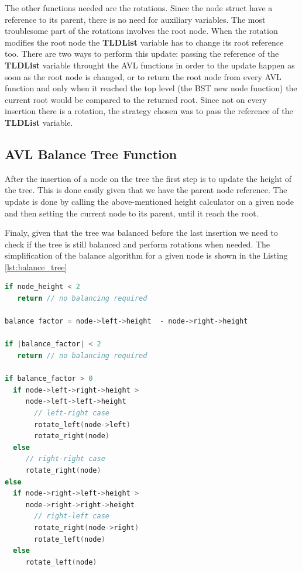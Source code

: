 \documentclass[twocolumn,10pt]{article}
\begin{document}
The other functions needed are the rotations. Since the node struct have a reference to its parent, there is no need for auxiliary variables. The most troublesome part of the rotations involves the root node. When the rotation modifies the root node the \textbf{TLDList} variable has to change its root reference too. There are two ways to perform this update: passing the reference of the \textbf{TLDList} variable throught the AVL functions in order to the update happen as soon as the root node is changed, or to return the root node from every AVL function and only when it reached the top level (the BST new node function) the current root would be compared to the returned root. Since not on every insertion there is a rotation, the strategy chosen was to pass the reference of the \textbf{TLDList} variable.

\subsection{AVL Balance Tree Function}

After the insertion of a node on the tree the first step is to update the height of the tree. This is done easily given that we have the parent node reference. The update is done by calling the above-mentioned height calculator on a given node and then setting the current node to its parent, until it reach the root.

Finaly, given that the tree was balanced before the last insertion we need to check if the tree is still balanced and perform rotations when needed. The simplification of the balance algorithm for a given node is shown in the Listing \ref{lst:balance_tree}

\begin{lstlisting}[language=C, caption={Balance Algorithm}, label=lst:balance_tree]
if node_height < 2
   return // no balancing required

balance factor = node->left->height  - node->right->height

if |balance_factor| < 2
   return // no balancing required

if balance_factor > 0
  if node->left->right->height > 
     node->left->left->height
       // left-right case
       rotate_left(node->left)
       rotate_right(node)
  else
     // right-right case
     rotate_right(node)
else
  if node->right->left->height >
     node->right->right->height
       // right-left case
       rotate_right(node->right)
       rotate_left(node)
  else
     rotate_left(node)
\end{lstlisting}
\end{document}
